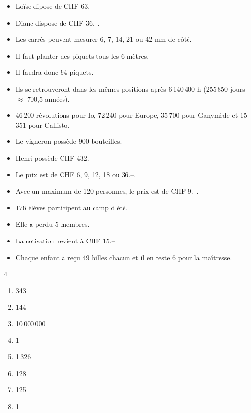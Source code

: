 \vspace{-20pt}\begin{itemize}[leftmargin=*,align=parleft]
\item[A.] Loïse dipose de CHF 63.--.
\item[B.] Diane dispose de CHF 36.--.
\item[D.] Les carrés peuvent mesurer 6, 7, 14, 21 ou 42 mm de côté.
\item[E.] Il faut planter des piquets tous les 6 mètres.
\item[] Il faudra donc 94 piquets.
\item[F.] Ils se retrouveront dans les mêmes positions après 6\,140\,400 h (255\,850 jours $\approx$ 700,5 années).
\item[] 46\,200 révolutions pour Io, 72\,240 pour Europe, 35\,700 pour Ganymède et 15\,351 pour Callisto.
\item[G.] Le vigneron possède 900 bouteilles.
\item[I.] Henri possède CHF 432.--
\item[K.] Le prix est de CHF 6, 9, 12, 18 ou 36.--.
\item[] Avec un maximum de 120 personnes, le prix est de CHF 9.--.
\item[L.] 176 élèves participent au camp d'été.
\item[M.] Elle a perdu 5 membres.
\item[] La cotisation revient à CHF 15.--
\item[N.] Chaque enfant a reçu 49 billes chacun et il en reste 6 pour la maîtresse.
\end{itemize}

\vspace{20pt}

\vspace{-15pt}\begin{multicols}{4}
\begin{enumerate}[leftmargin=*,align=parleft, label=\alph*)]
\item 343
\item 144
\item 10\,000\,000
\item 1 
\item 1\,326
\item 128
\item 125
\item 1
\end{enumerate}
\end{multicols}

